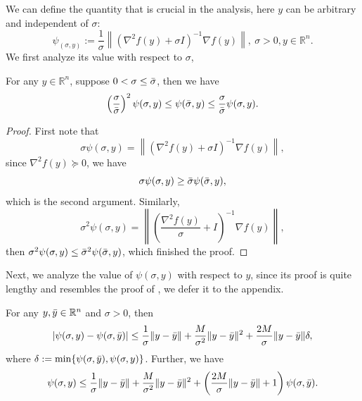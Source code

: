 \documentclass{article}
\begin{document}
We can define the quantity that is crucial in the analysis, here $y$ can be arbitrary and independent of $\sigma$:
\begin{equation}
    \label{eq.linesearch quantity}
    \psi_(\sigma,y) := \frac{1}{\sigma}\left \| \left(\nabla^2 f(y)+\sigma I \right)^{-1}\nabla f(y)\right \|, \ \sigma>0, y\in\mathbb{R}^n.
\end{equation}
We first analyze its value with respect to $\sigma$,
\begin{lemma}
    \label{lem.psi property wrt sigma}
    For any $y\in\mathbb{R}^n$, suppose $0<\sigma\leq \Bar{\sigma}$, then we have
    \begin{equation}
        \label{eq.psi property wrt sigma}
        \left(\frac{\sigma}{\Bar{\sigma}}\right)^2 \psi(\sigma,y)\leq \psi(\Bar{\sigma},y) \leq \frac{\sigma}{\Bar{\sigma}}\psi(\sigma,y).
    \end{equation}
\end{lemma}
\begin{proof}
    First note that 
    \begin{equation*}
        \sigma \psi(\sigma,y) = \left \| \left(\nabla^2 f(y)+\sigma I \right)^{-1}\nabla f(y)\right \|,
    \end{equation*}
    since $\nabla^2 f(y)\succeq 0$, we have
    \begin{equation*}
        \sigma \psi(\sigma,y) \geq \Bar{\sigma} \psi(\Bar{\sigma},y),
    \end{equation*}
    which is the second argument. Similarly,
    \begin{equation*}
        \sigma^2 \psi(\sigma,y) = \left \| \left(\frac{\nabla^2 f(y)}{\sigma}+ I \right)^{-1}\nabla f(y)\right \|,
    \end{equation*}
    then $\sigma^2 \psi(\sigma,y)\leq \Bar{\sigma}^2 \psi(\Bar{\sigma},y)$, which finished the proof.
\end{proof}
Next, we analyze the value of $\psi(\sigma,y)$ with respect to $y$, since its proof is quite lengthy and resembles the proof of \citet[Lemma 7.5]{monteiro2013accelerated}, we defer it to the appendix.
\begin{lemma}
    \label{lem.psi property wrt y}
    For any $y,\Bar{y} \in \mathbb{R}^n$ and $\sigma>0$, then 
    \begin{equation}
        \label{eq.psi property wrt y}
       \left \vert \psi(\sigma,y)-\psi(\sigma,\Bar{y}) \right\vert \leq \frac{1}{\sigma}\|y-\Bar{y}\| +\frac{M}{\sigma^2}\|y-\Bar{y}\|^2 +\frac{2M}{\sigma}\|y-\Bar{y}\|\delta,
    \end{equation}
    where $\delta:=\min\{\psi(\sigma,\Bar{y}),\psi(\sigma,y)\}$. Further, we have
    \begin{equation}
        \label{eq.psi property wrt y advanced}
        \psi(\sigma,y) \leq \frac{1}{\sigma}\|y-\Bar{y}\| +\frac{M}{\sigma^2}\|y-\Bar{y}\|^2 +\left(\frac{2M}{\sigma}\|y-\Bar{y}\|+1\right)\psi(\sigma,\Bar{y}).
    \end{equation}
\end{lemma}
\end{document}
